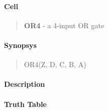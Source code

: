 \label{OR4}
\paragraph{Cell}
\begin{quote}
    \textbf{OR4} - a 4-input OR gate
\end{quote}

\paragraph{Synopsys}
\begin{quote}
    OR4(Z, D, C, B, A)
\end{quote}

\paragraph{Description}



\paragraph{Truth Table}


